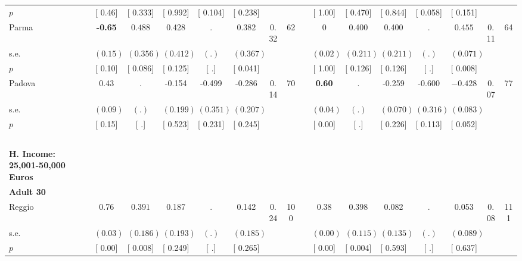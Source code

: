 \begin{longtable}{L{8em} c c c c c c c p{1em} c c c c c c c}
\quad \quad \quad \quad $ p$ & [     0.46] & [    0.333] & [    0.992] & [    0.104] & [    0.238] & & & & [     1.00] & [    0.470] & [    0.844] & [    0.058] & [    0.151] & &  \\[1em]
\quad \quad \quad Parma& \textbf{    -0.65} & $ \mathbf{    0.488}$ &     0.428 &         . & $ \mathbf{    0.382}$ &      0.32 &        62 & & 0 &     0.400 &     0.400 &         . & $ \mathbf{    0.455}$ &      0.11 &        64  \\*
\quad \quad \quad \quad s.e.& $ (     0.15)$ & $ (    0.356)$ & $ (    0.412)$ & $ (        .)$ & $ (    0.367)$ & & & & $ (     0.02)$ & $ (    0.211)$ & $ (    0.211)$ & $ (        .)$ & $ (    0.071)$ & &  \\*
\quad \quad \quad \quad $ p$ & [     0.10] & [    0.086] & [    0.125] & [        .] & [    0.041] & & & & [     1.00] & [    0.126] & [    0.126] & [        .] & [    0.008] & &  \\[1em]
\quad \quad \quad Padova& 0.43 &         . &    -0.154 &    -0.499 &    -0.286 &      0.14 &        70 & & \textbf{     0.60} &         . &    -0.259 &    -0.600 & $ \mathbf{   -0.428}$ &      0.07 &        77  \\*
\quad \quad \quad \quad s.e.& $ (     0.09)$ & $ (        .)$ & $ (    0.199)$ & $ (    0.351)$ & $ (    0.207)$ & & & & $ (     0.04)$ & $ (        .)$ & $ (    0.070)$ & $ (    0.316)$ & $ (    0.083)$ & &  \\*
\quad \quad \quad \quad $ p$ & [     0.15] & [        .] & [    0.523] & [    0.231] & [    0.245] & & & & [     0.00] & [        .] & [    0.226] & [    0.113] & [    0.052] & &  \\[1em]
~\\[1em]
\textbf{H. Income: 25,001-50,000 Euros} \\*
\quad \quad \textbf{Adult 30} & & & & & & & & & & & & & & & \\* 
\quad \quad \quad Reggio& 0.76 & $ \mathbf{    0.391}$ &     0.187 &         . &     0.142 &      0.24 &       100 & & 0.38 & $ \mathbf{    0.398}$ &     0.082 &         . &     0.053 &      0.08 &       111  \\*
\quad \quad \quad \quad s.e.& $ (     0.03)$ & $ (    0.186)$ & $ (    0.193)$ & $ (        .)$ & $ (    0.185)$ & & & & $ (     0.00)$ & $ (    0.115)$ & $ (    0.135)$ & $ (        .)$ & $ (    0.089)$ & &  \\*
\quad \quad \quad \quad $ p$ & [     0.00] & [    0.008] & [    0.249] & [        .] & [    0.265] & & & & [     0.00] & [    0.004] & [    0.593] & [        .] & [    0.637] & &  \\[1em]

\end{longtable}
